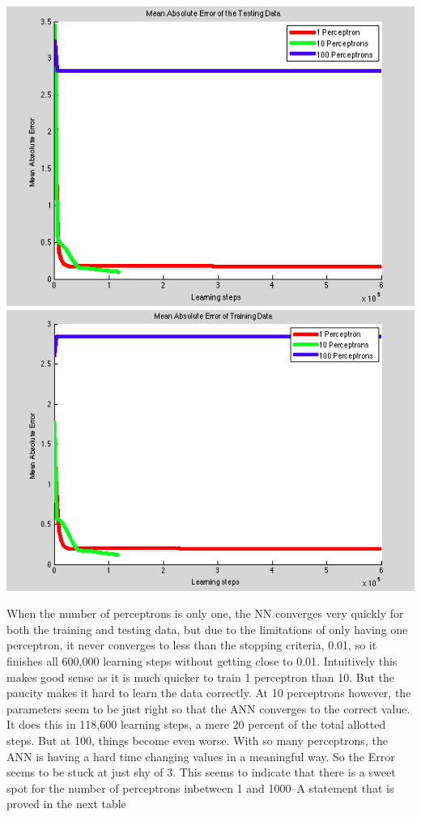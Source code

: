 \documentclass[epsfig]{article}
\begin{document}
\begin{center}
\includegraphics[scale=0.4]{pic4}
\includegraphics[scale=0.4]{pic4b}
\end{center}
When the number of perceptrons is only one, the NN converges very quickly for both the training and testing data, but due to the limitations of only having one perceptron, it never converges to less than the stopping criteria, 0.01, so it finishes all 600,000 learning steps without getting close to 0.01. Intuitively this makes good sense as it is much quicker to train 1 perceptron than 10. But the paucity makes it hard to learn the data correctly. At 10 perceptrons however, the parameters seem to be just right so that the ANN converges to the correct value. It does this in 118,600 learning steps, a mere 20 percent of the total allotted steps. But at 100, things become even worse. With so many perceptrons, the ANN is having a hard time changing values in a meaningful way. So the Error seems to be stuck at just shy of 3. This seems to indicate that there is a sweet spot for the number of perceptrons inbetween 1 and 1000--A statement that is proved in the next table
\end{document}
